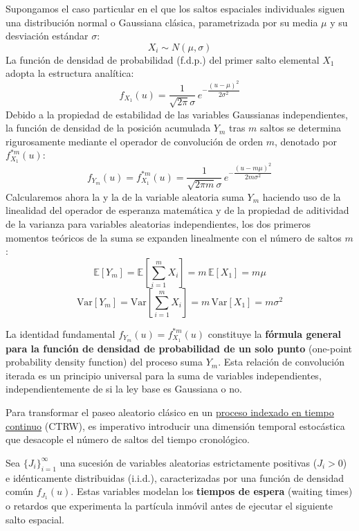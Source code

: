 \noindent 
Supongamos el caso particular en el que los saltos espaciales individuales siguen una distribución normal o Gaussiana clásica, parametrizada por su media $\mu$ y su desviación estándar $\sigma$:
\[
X_i \sim N(\mu, \sigma)
\]
La función de densidad de probabilidad (f.d.p.) del primer salto elemental $X_1$ adopta la estructura analítica:
\[
f_{X_1}(u) = \frac{1}{\sqrt{2\pi}\sigma} \, e^{-\dfrac{(u-\mu)^2}{2\sigma^2}}
\]
Debido a la propiedad de estabilidad de las variables Gaussianas independientes, la función de densidad de la posición acumulada $Y_m$ tras $m$ saltos se determina rigurosamente mediante el operador de convolución de orden $m$, denotado por $f_{X_1}^{*m}(u)$:
\[
f_{Y_m}(u) = f_{X_1}^{*m}(u) = \frac{1}{\sqrt{2\pi m}\sigma} \, e^{-\dfrac{(u-m\mu)^2}{2m\sigma^2}}
\]
Calcularemos ahora la  y la  de la variable aleatoria suma $Y_m$ haciendo uso de la linealidad del operador de esperanza matemática y de la propiedad de aditividad de la varianza para variables aleatorias independientes, los dos primeros momentos teóricos de la suma se expanden linealmente con el número de saltos $m$:
\[
\mathbb{E}[Y_m] = \mathbb{E}\left[\sum_{i=1}^{m} X_i\right] = m \, \mathbb{E}[X_1] = m\mu
\]
\[
\text{Var}[Y_m] = \text{Var}\left[\sum_{i=1}^{m} X_i\right] = m \, \text{Var}[X_1] = m\sigma^2
\]

\begin{observacion}
    La identidad fundamental $f_{Y_m}(u) = f_{X_1}^{*m}(u)$ constituye la \textbf{fórmula general para la función de densidad de probabilidad de un solo punto} (one-point probability density function) del proceso suma $Y_m$. Esta relación de convolución iterada es un principio universal para la suma de variables independientes, independientemente de si la ley base es Gaussiana o no. \\
\end{observacion}

\noindent 
Para transformar el paseo aleatorio clásico en un \underline{proceso indexado en tiempo continuo} (CTRW), es imperativo introducir una dimensión temporal estocástica que desacople el número de saltos del tiempo cronológico. \\

\noindent 
\begin{definicion}
    Sea $\{J_i\}_{i=1}^{\infty}$ una sucesión de variables aleatorias estrictamente positivas ($J_i > 0$) e idénticamente distribuidas (i.i.d.), caracterizadas por una función de densidad común $f_{J_1}(u)$. Estas variables modelan los \textbf{tiempos de espera} (waiting times) o retardos que experimenta la partícula inmóvil antes de ejecutar el siguiente salto espacial.
\end{definicion}

